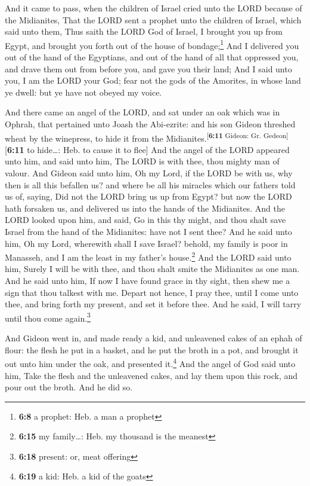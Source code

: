  And it came to pass, when the children of Israel cried
unto the LORD because of the Midianites,  That the LORD
sent a prophet unto the children of Israel, which said unto them, Thus
saith the LORD God of Israel, I brought you up from Egypt, and brought
you forth out of the house of bondage;\footnote{\textbf{6:8} a prophet:
  Heb. a man a prophet}  And I delivered you out of the
hand of the Egyptians, and out of the hand of all that oppressed you,
and drave them out from before you, and gave you their land;
 And I said unto you, I am the LORD your God; fear not
the gods of the Amorites, in whose land ye dwell: but ye have not obeyed
my voice.

 And there came an angel of the LORD, and sat under an
oak which was in Ophrah, that pertained unto Joash the Abi-ezrite: and
his son Gideon threshed wheat by the winepress, to hide it from the
Midianites.\textsuperscript{{[}\textbf{6:11} Gideon: Gr.
Gedeon{]}}{[}\textbf{6:11} to hide\ldots: Heb. to cause it to flee{]}
 And the angel of the LORD appeared unto him, and said
unto him, The LORD is with thee, thou mighty man of valour.
 And Gideon said unto him, Oh my Lord, if the LORD be
with us, why then is all this befallen us? and where be all his miracles
which our fathers told us of, saying, Did not the LORD bring us up from
Egypt? but now the LORD hath forsaken us, and delivered us into the
hands of the Midianites.  And the LORD looked upon him,
and said, Go in this thy might, and thou shalt save Israel from the hand
of the Midianites: have not I sent thee?  And he said
unto him, Oh my Lord, wherewith shall I save Israel? behold, my family
is poor in Manasseh, and I am the least in my father's house.\footnote{\textbf{6:15}
  my family\ldots: Heb. my thousand is the meanest}  And
the LORD said unto him, Surely I will be with thee, and thou shalt smite
the Midianites as one man.  And he said unto him, If now
I have found grace in thy sight, then shew me a sign that thou talkest
with me.  Depart not hence, I pray thee, until I come
unto thee, and bring forth my present, and set it before thee. And he
said, I will tarry until thou come again.\footnote{\textbf{6:18}
  present: or, meat offering}

 And Gideon went in, and made ready a kid, and unleavened
cakes of an ephah of flour: the flesh he put in a basket, and he put the
broth in a pot, and brought it out unto him under the oak, and presented
it.\footnote{\textbf{6:19} a kid: Heb. a kid of the goats}
 And the angel of God said unto him, Take the flesh and
the unleavened cakes, and lay them upon this rock, and pour out the
broth. And he did so.

